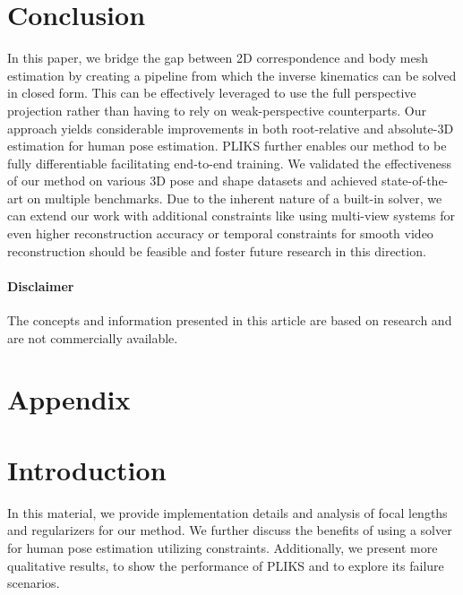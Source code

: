 \documentclass[10pt,twocolumn,letterpaper]{article}
\begin{document}
\section{Conclusion}
In this paper, we bridge the gap between 2D correspondence and body mesh estimation by creating a pipeline from which the inverse kinematics can be solved in closed form. This can be effectively leveraged to use the full perspective projection rather than having to rely on weak-perspective counterparts. Our approach yields considerable improvements in both root-relative and absolute-3D estimation for human pose estimation. PLIKS further enables our method to be fully differentiable facilitating end-to-end training. We validated the effectiveness of our method on various 3D pose and shape datasets and achieved state-of-the-art on multiple benchmarks. Due to the inherent nature of a built-in solver, we can extend our work with additional constraints like using multi-view systems for even higher reconstruction accuracy or temporal constraints for smooth video reconstruction should be feasible and foster future research in this direction.



\paragraph*{Disclaimer}
The concepts and information presented in this article are based on research and are not commercially available.



{\small


}
\clearpage

\section*{Appendix}

\maketitle


\section{Introduction}
In this material, we provide implementation details and analysis of focal lengths and regularizers for our method. We further discuss the benefits of using a solver for human pose estimation utilizing constraints. Additionally, we present more qualitative results, to show the performance of PLIKS and to explore its failure scenarios.
\end{document}
